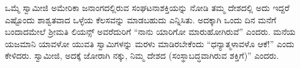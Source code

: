 
 ಒಮ್ಮೆ ಸ್ವಾಮೀಜಿ ಅಮೇರಿಕಾ ಜನಾಂಗದಲ್ಲಿರುವ ಸಂಘಟನಾಶಕ್ತಿಯನ್ನು ನೋಡಿ ತಮ್ಮ ದೇಶದಲ್ಲಿ ಅದು ಇದ್ದರೆ ಎಷ್ಟೊಂದು ಶಾಶ್ವತವಾದ ಒಳ್ಳೆಯ ಕೆಲಸವನ್ನು ಮಾಡಬಹುದು ಎನ್ನಿಸಿತು. ಅದಕ್ಕಾಗಿ ಒಂದು ದಿನ ಮನೆಗೆ ಬಂದಾದಮೇಲೆ ಶ‍್ರೀಮತಿ ಲಿಯನ್ಸ್ ಅವರೆದುರಿಗೆ “ನಾನು ಯಾರಿಗೋ ಮಾರುಹೋಗಿರುವೆ” ಎಂದರು. ಮನೆಯ ಯಜಮಾನಿ ಯಾವಳೋ ಯುವತಿ ಸ್ವಾಮಿಗಳನ್ನು ಮರಳು ಮಾಡಿರಬೇಕೆಂದು “ಧನ್ಯಾತ್ಮಳಾವಳೊ ಆಕೆ!” ಎಂದು ಕೇಳಿದರು. ಸ್ವಾಮೀಜಿ, ಅದಕ್ಕೆ ಜೋರಾಗಿ ನಕ್ಕು, ನಿಮ್ಮ ದೇಶದ  (ಸಂಸ್ಥಾಬದ್ಧವಾಗಿರುವ ಶಕ್ತಿಗೆ)” ಎಂದರು. 


